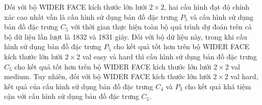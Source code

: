 {    \noindent
    Đối với bộ WIDER FACE kích thước lớn lưới $2 \times 2$, hai cấu hình đạt độ chính xác cao nhất vẫn là cấu hình sử dụng bản đồ đặc trưng ${P}_{5}$ và cấu hình sử dụng bản đồ đặc trưng ${C}_{5}$ với thời gian thực hiện toàn bộ quá trình dự đoán trên cả bộ dữ liệu lần lượt là 1832 và 1831 giây.
    Đối với bộ dữ liệu này, trong khi cấu hình sử dụng bản đồ đặc trưng ${P}_{5}$ cho kết quả tốt hơn trên bộ WIDER FACE kích thước lớn lưới $2 \times 2$ val easy và hard thì cấu hình sử dụng bản đồ đặc trưng ${C}_{5}$ cho kết quả tốt hơn trên bộ WIDER FACE kích thước lớn lưới $2 \times 2$ val medium.
    Tuy nhiên, đối với bộ WIDER FACE kích thước lớn lưới $2 \times 2$ val hard, kết quả của cấu hình sử dụng bản đồ đặc trưng ${C}_{4}$ và ${P}_{3}$ cho kết quả khá tiệm cận với cấu hình sử dụng bản đồ đặc trưng ${C}_{5}$.

}

